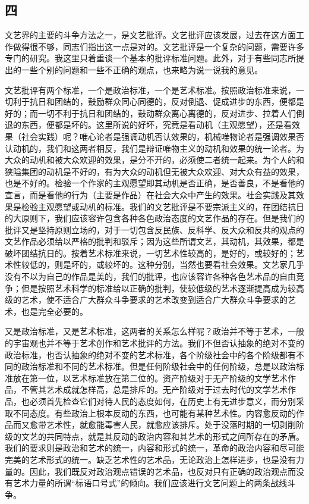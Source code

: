 \subsection*{四}

文艺界的主要的斗争方法之一，是文艺批评。文艺批评应该发展，过去在这方面工作做得很不够，同志们指出这一点是对的。文艺批评是一个复杂的问题，需要许多专门的研究。我这里只着重谈一个基本的批评标准问题。此外，对于有些同志所提出的一些个别的问题和一些不正确的观点，也来略为说一说我的意见。

文艺批评有两个标准，一个是政治标准，一个是艺术标准。按照政治标准来说，一切利于抗日和团结的，鼓励群众同心同德的，反对倒退、促成进步的东西，便都是好的；而一切不利于抗日和团结的，鼓动群众离心离德的，反对进步、拉着人们倒退的东西，便都是坏的。这里所说的好坏，究竟是看动机（主观愿望），还是看效果（社会实践）呢？唯心论者是强调动机否认效果的，机械唯物论者是强调效果否认动机的，我们和这两者相反，我们是辩证唯物主义的动机和效果的统一论者。为大众的动机和被大众欢迎的效果，是分不开的，必须使二者统一起来。为个人的和狭隘集团的动机是不好的，有为大众的动机但无被大众欢迎、对大众有益的效果，也是不好的。检验一个作家的主观愿望即其动机是否正确，是否善良，不是看他的宣言，而是看他的行为（主要是作品）在社会大众中产生的效果。社会实践及其效果是检验主观愿望或动机的标准。我们的文艺批评是不要宗派主义的，在团结抗日的大原则下，我们应该容许包含各种各色政治态度的文艺作品的存在。但是我们的批评又是坚持原则立场的，对于一切包含反民族、反科学、反大众和反共的观点的文艺作品必须给以严格的批判和驳斥；因为这些所谓文艺，其动机，其效果，都是破坏团结抗日的。按着艺术标准来说，一切艺术性较高的，是好的，或较好的；艺术性较低的，则是坏的，或较坏的。这种分别，当然也要看社会效果。文艺家几乎没有不以为自己的作品是美的，我们的批评，也应该容许各种各色艺术品的自由竞争；但是按照艺术科学的标准给以正确的批判，使较低级的艺术逐渐提高成为较高级的艺术，使不适合广大群众斗争要求的艺术改变到适合广大群众斗争要求的艺术，也是完全必要的。

又是政治标准，又是艺术标准，这两者的关系怎么样呢？政治并不等于艺术，一般的宇宙观也并不等于艺术创作和艺术批评的方法。我们不但否认抽象的绝对不变的政治标准，也否认抽象的绝对不变的艺术标准，各个阶级社会中的各个阶级都有不同的政治标准和不同的艺术标准。但是任何阶级社会中的任何阶级，总是以政治标准放在第一位，以艺术标准放在第二位的。资产阶级对于无产阶级的文学艺术作品，不管其艺术成就怎样高，总是排斥的。无产阶级对于过去时代的文学艺术作品，也必须首先检查它们对待人民的态度如何，在历史上有无进步意义，而分别采取不同态度。有些政治上根本反动的东西，也可能有某种艺术性。内容愈反动的作品而又愈带艺术性，就愈能毒害人民，就愈应该排斥。处于没落时期的一切剥削阶级的文艺的共同特点，就是其反动的政治内容和其艺术的形式之间所存在的矛盾。我们的要求则是政治和艺术的统一，内容和形式的统一，革命的政治内容和尽可能完美的艺术形式的统一。缺乏艺术性的艺术品，无论政治上怎样进步，也是没有力量的。因此，我们既反对政治观点错误的艺术品，也反对只有正确的政治观点而没有艺术力量的所谓“标语口号式”的倾向。我们应该进行文艺问题上的两条战线斗争。

